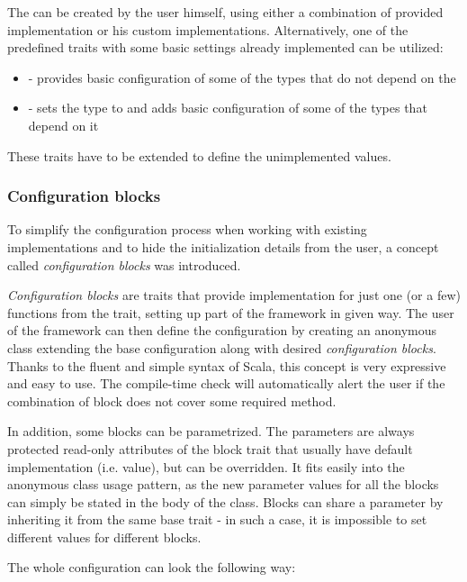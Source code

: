 The  can be created by the user himself, using either a combination of provided implementation or his custom implementations. Alternatively, one of the predefined  traits with some basic settings already implemented can be utilized:

\begin{itemize}
	\item {} - provides basic configuration of some of the types that do not depend on the 
	\item {} - sets the  type to  and adds basic configuration of some of the types that depend on it
\end{itemize}

These traits have to be extended to define the unimplemented values.

\subsubsection{Configuration blocks}
 To simplify the configuration process when working with existing implementations and to hide the initialization details from the user, a concept called \textit{configuration blocks} was introduced. 
 
 \textit{Configuration blocks} are traits that provide implementation for just one (or a few) functions from the  trait, setting up part of the framework in given way. The user of the framework can then define the configuration by creating an anonymous class extending the base configuration along with desired \textit{configuration blocks}. Thanks to the fluent and simple syntax of Scala, this concept is very expressive and easy to use. The compile-time check will automatically alert the user if the combination of block does not cover some required method.
 
 In addition, some blocks can be parametrized. The parameters are always protected read-only attributes of the block trait that usually have default implementation (i.e. value), but can be overridden. It fits easily into the anonymous class usage pattern, as the new parameter values for all the blocks can simply be stated in the body of the class. Blocks can share a parameter by inheriting it from the same base trait - in such a case, it is impossible to set different values for different blocks.
 
 The whole configuration can look the following way:

